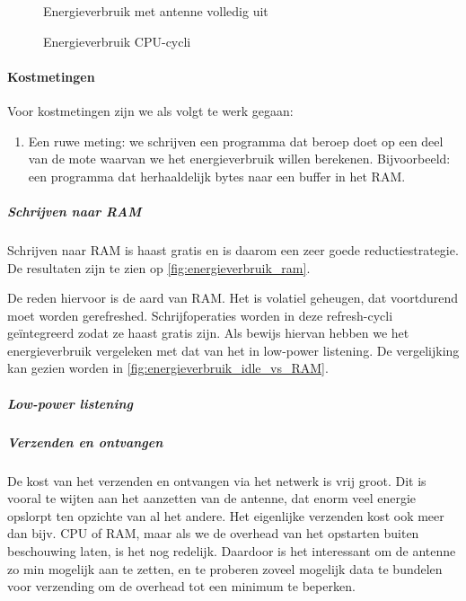 \documentclass{article}
\begin{document}
\begin{figure}[h]
\centering
\missingfigure{}
\caption{Energieverbruik met antenne volledig uit}
\label{fig:energieverbruik_antenne_uit}
\end{figure}

\begin{figure}[h]
\centering

\caption{Energieverbruik CPU-cycli}
\label{fig:energieverbruik_cpu}
\end{figure}

\paragraph{Kostmetingen}

Voor kostmetingen zijn we als volgt te werk gegaan:

\begin{enumerate}
\item Een ruwe meting: we schrijven een programma dat beroep doet op een deel
van de mote waarvan we het energieverbruik willen berekenen. Bijvoorbeeld: een
programma dat herhaaldelijk bytes naar een buffer in het RAM. 
\end{enumerate}

\subparagraph{Schrijven naar RAM}

Schrijven naar RAM is haast gratis en is daarom een zeer goede
reductiestrategie. De resultaten zijn te zien op \ref{fig:energieverbruik_ram}.

De reden hiervoor is de aard van RAM. Het is volatiel geheugen, dat voortdurend
moet worden gerefreshed. Schrijfoperaties worden in deze refresh-cycli
ge\"integreerd zodat ze haast gratis zijn. Als bewijs hiervan hebben we het energieverbruik vergeleken met dat van het in low-power listening. 
De vergelijking kan gezien worden in \ref{fig:energieverbruik_idle_vs_RAM}.\\
\subparagraph{Low-power listening}


\subparagraph{Verzenden en ontvangen}

De kost van het verzenden en ontvangen via het netwerk is vrij groot. Dit is
vooral te wijten aan het aanzetten van de antenne, dat enorm veel energie
opslorpt ten opzichte van al het andere. Het eigenlijke verzenden kost ook meer
dan bijv. CPU of RAM, maar als we de overhead van het opstarten buiten
beschouwing laten, is het nog redelijk. Daardoor is het interessant om de
antenne zo min mogelijk aan te zetten, en te proberen zoveel mogelijk data te
bundelen voor verzending om de overhead tot een minimum te beperken.
\end{document}
